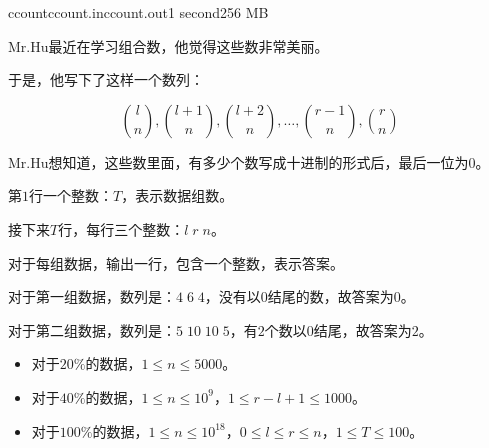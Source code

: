 \documentclass[11pt,a4paper,oneside]{article}
\begin{document}
\begin{problem}{ccount}{ccount.in}{ccount.out}{1 second}{256 MB}	
	
	Mr.Hu最近在学习组合数，他觉得这些数非常美丽。
	
	于是，他写下了这样一个数列：
	
	$$
		\binom{l}{n}, \binom{l+1}{n}, \binom{l+2}{n}, \dots, \binom{r-1}{n}, \binom{r}{n}
	$$
	
	Mr.Hu想知道，这些数里面，有多少个数写成十进制的形式后，最后一位为$0$。
	
	\InputFile
	
	第$1$行一个整数：$T$，表示数据组数。
	
	接下来$T$行，每行三个整数：$l \; r \; n$。
	
	\OutputFile
	
	对于每组数据，输出一行，包含一个整数，表示答案。
	
	\Example
	
	\begin{example}
	\end{example}
	
	对于第一组数据，数列是：$4 \; 6 \; 4$，没有以$0$结尾的数，故答案为$0$。
	
	对于第二组数据，数列是：$5 \; 10 \; 10 \; 5$，有$2$个数以$0$结尾，故答案为$2$。
	
	\Note
	
	\begin{itemize}
		\item 对于$20\%$的数据，$1 \leq n \leq 5000$。
		\item 对于$40\%$的数据，$1 \leq n \leq 10^9$，$1 \leq r - l + 1 \leq 1000$。
		\item 对于$100\%$的数据，$1 \leq n \leq 10^18$，$0 \leq l \leq r \leq n$，$1 \leq T \leq 100$。
	\end{itemize}

\end{problem}
\end{document}
